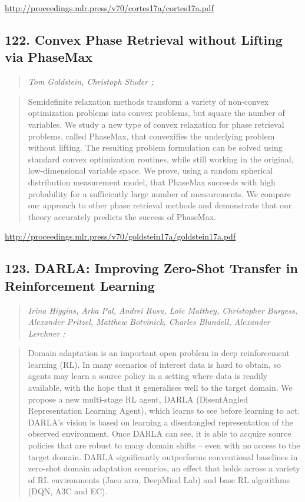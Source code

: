 \documentclass{article}
\begin{document}
\href{http://proceedings.mlr.press/v70/cortes17a/cortes17a.pdf}{http://proceedings.mlr.press/v70/cortes17a/cortes17a.pdf}

\subsection{122. Convex Phase Retrieval without Lifting via PhaseMax}

\begin{quote}
\footnotesize{\textit{Tom Goldstein, Christoph Studer ;}}
\end{quote}

\begin{quote}
    Semidefinite relaxation methods transform a variety of non-convex optimization problems into convex problems, but square the number of variables. We study a new type of convex relaxation for phase retrieval problems, called PhaseMax, that convexifies the underlying problem without lifting. The resulting problem formulation can be solved using standard convex optimization routines, while still working in the original, low-dimensional variable space. We prove, using a random spherical distribution measurement model, that PhaseMax succeeds with high probability for a sufficiently large number of measurements. We compare our approach to other phase retrieval methods and demonstrate that our theory accurately predicts the success of PhaseMax.  \end{quote}

\href{http://proceedings.mlr.press/v70/goldstein17a/goldstein17a.pdf}{http://proceedings.mlr.press/v70/goldstein17a/goldstein17a.pdf}

\subsection{123. DARLA: Improving Zero-Shot Transfer in Reinforcement Learning}

\begin{quote}
\footnotesize{\textit{Irina Higgins, Arka Pal, Andrei Rusu, Loic Matthey, Christopher Burgess, Alexander Pritzel, Matthew Botvinick, Charles Blundell, Alexander Lerchner ;}}
\end{quote}

\begin{quote}
    Domain adaptation is an important open problem in deep reinforcement learning (RL). In many scenarios of interest data is hard to obtain, so agents may learn a source policy in a setting where data is readily available, with the hope that it generalises well to the target domain. We propose a new multi-stage RL agent, DARLA (DisentAngled Representation Learning Agent), which learns to see before learning to act. DARLA’s vision is based on learning a disentangled representation of the observed environment. Once DARLA can see, it is able to acquire source policies that are robust to many domain shifts – even with no access to the target domain. DARLA significantly outperforms conventional baselines in zero-shot domain adaptation scenarios, an effect that holds across a variety of RL environments (Jaco arm, DeepMind Lab) and base RL algorithms (DQN, A3C and EC).  \end{quote}
\end{document}
